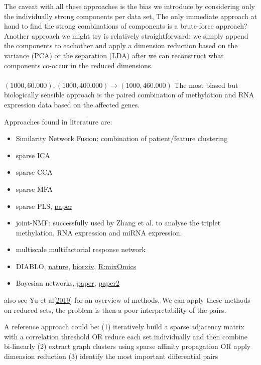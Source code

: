 \documentclass[a4paper,10pt]{article}
\begin{document}
The caveat with all these approaches is the bias we introduce by considering only the individually strong components per data set, 
The only immediate approach at hand to find the strong combinations of components is a brute-force approach?
Another approach we might try is relatively straightforward: we simply append the components to eachother and apply a
dimension reduction based on the variance (PCA) or the separation (LDA) after we can reconstruct what
components co-occur in the reduced dimensions. \\ \\
%
$(1000, 60.000),(1000, 400.000) \rightarrow (1000, 460.000)$
%
The most biased but biologically sensible approach is the paired combination of methylation and RNA expression data
based on the affected genes. 

Approaches found in literature are:
\begin{itemize}
 \item Similarity Network Fusion: combination of patient/feature clustering
 \item sparse ICA
 \item sparse CCA
 \item sparse MFA
 \item sparse PLS, \href{https://bmcbioinformatics.biomedcentral.com/articles/10.1186/1471-2105-12-253}{paper}
 \item joint-NMF: successfully used by Zhang et al. to analyse the triplet methylation, RNA expression and miRNA expression.
 \item multiscale multifactorial response network 
 \item DIABLO, \href{https://www.nature.com/articles/s41467-019-08794-x.pdf}{nature}, \href{https://www.biorxiv.org/content/10.1101/067611v2}{biorxiv}, \href{https://journals.plos.org/ploscompbiol/article?id=10.1371/journal.pcbi.1005752}{R:mixOmics}
 \item Bayesian networks, \href{https://www.ncbi.nlm.nih.gov/pmc/articles/PMC2701418/}{paper}, \href{https://www.cell.com/cell-systems/fulltext/S2405-4712(17)30548-3}{paper2}
\end{itemize}
%
also see Yu et al[\href{https://www.sciencedirect.com/science/article/pii/S2452310018301197}{2019}] for an overview of methods.
We can apply these methods on reduced sets, the problem is then a poor interpretability of the pairs.

A reference approach could be:
(1) iteratively build a sparse adjacency matrix with a correlation threshold OR reduce each set individually and then combine bi-linearly
(2) extract graph clusters using sparse affinity propagation OR apply dimension reduction
(3) identify the most important differential pairs
%
\end{document}
